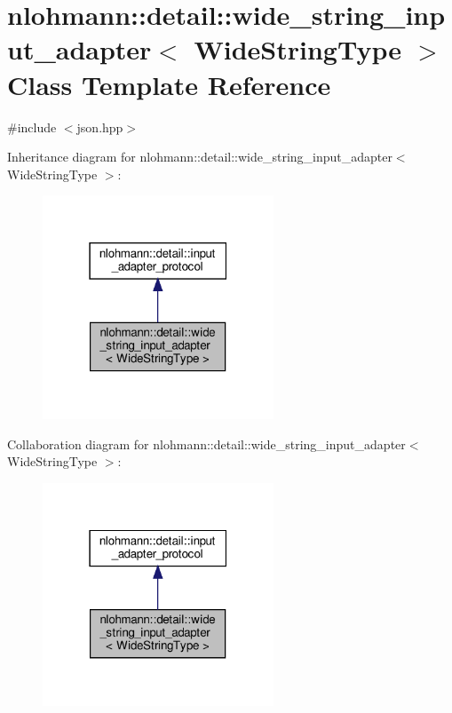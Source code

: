 \hypertarget{classnlohmann_1_1detail_1_1wide__string__input__adapter}{}\section{nlohmann\+:\+:detail\+:\+:wide\+\_\+string\+\_\+input\+\_\+adapter$<$ Wide\+String\+Type $>$ Class Template Reference}
\label{classnlohmann_1_1detail_1_1wide__string__input__adapter}


{\ttfamily \#include $<$json.\+hpp$>$}



Inheritance diagram for nlohmann\+:\+:detail\+:\+:wide\+\_\+string\+\_\+input\+\_\+adapter$<$ Wide\+String\+Type $>$\+:
\nopagebreak
\begin{figure}[H]
\begin{center}
\leavevmode
\includegraphics[width=195pt]{classnlohmann_1_1detail_1_1wide__string__input__adapter__inherit__graph}
\end{center}
\end{figure}


Collaboration diagram for nlohmann\+:\+:detail\+:\+:wide\+\_\+string\+\_\+input\+\_\+adapter$<$ Wide\+String\+Type $>$\+:
\nopagebreak
\begin{figure}[H]
\begin{center}
\leavevmode
\includegraphics[width=195pt]{classnlohmann_1_1detail_1_1wide__string__input__adapter__coll__graph}
\end{center}
\end{figure}
